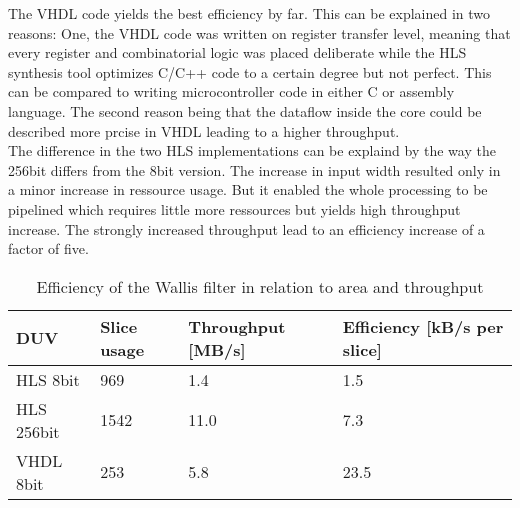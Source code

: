 The VHDL code yields the best efficiency by far. This can be explained in two
reasons: One, the VHDL code was written on register transfer level, meaning that
every register and combinatorial logic was placed deliberate while the HLS
synthesis tool optimizes C/C++ code to a certain degree but not perfect. This
can be compared to writing microcontroller code in either C or assembly
language. The second reason being that the dataflow inside the core could be
described more prcise in VHDL leading to a higher throughput.
\\

The difference in the two HLS implementations can be explaind by the way the
256bit differs from the 8bit version. The increase in input width resulted only
in a minor increase in ressource usage. But it enabled the whole processing to be
pipelined which requires little more ressources but yields high throughput
increase. The strongly increased throughput lead to an efficiency increase of a
factor of five.
\\

\begin{table}[h!]
    \centering
    \begin{tabular}{l l l l}
        \toprule
        DUV         & Slice usage & Throughput [MB/s] & Efficiency [kB/s per
        slice]\\
        \midrule
        HLS  8bit    &  969          & 1.4               & 1.5   \\
        HLS  256bit  &  1542         & 11.0              & 7.3   \\
        VHDL 8bit    &  253          & 5.8               & 23.5  \\
        \bottomrule
    \end{tabular}
    \caption{Efficiency of the Wallis filter in relation to area and throughput}
    \label{tab:efficiency}
\end{table}






